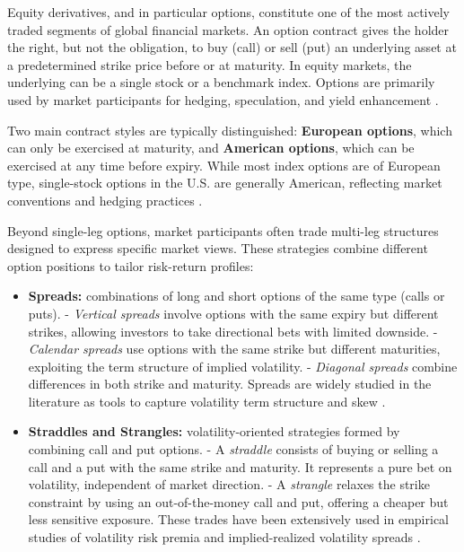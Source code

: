 \documentclass[12pt,a4paper]{report}
\begin{document}
Equity derivatives, and in particular options, constitute one of the most actively traded segments of global financial markets. An option contract gives the holder the right, but not the obligation, to buy (call) or sell (put) an underlying asset at a predetermined strike price before or at maturity. In equity markets, the underlying can be a single stock or a benchmark index. Options are primarily used by market participants for hedging, speculation, and yield enhancement \citep{hull2018options}.

Two main contract styles are typically distinguished: \textbf{European options}, which can only be exercised at maturity, and \textbf{American options}, which can be exercised at any time before expiry. While most index options are of European type, single-stock options in the U.S. are generally American, reflecting market conventions and hedging practices \citep{cboe2020guide}.

Beyond single-leg options, market participants often trade multi-leg structures designed to express specific market views. These strategies combine different option positions to tailor risk-return profiles:

\begin{itemize}
    \item \textbf{Spreads:} combinations of long and short options of the same type (calls or puts).  
    - \emph{Vertical spreads} involve options with the same expiry but different strikes, allowing investors to take directional bets with limited downside.  
    - \emph{Calendar spreads} use options with the same strike but different maturities, exploiting the term structure of implied volatility.  
    - \emph{Diagonal spreads} combine differences in both strike and maturity.  
    Spreads are widely studied in the literature as tools to capture volatility term structure and skew \citep{stoll1969price, chance1996analysis}.  

    \item \textbf{Straddles and Strangles:} volatility-oriented strategies formed by combining call and put options.  
    - A \emph{straddle} consists of buying or selling a call and a put with the same strike and maturity. It represents a pure bet on volatility, independent of market direction.  
    - A \emph{strangle} relaxes the strike constraint by using an out-of-the-money call and put, offering a cheaper but less sensitive exposure.  
    These trades have been extensively used in empirical studies of volatility risk premia and implied-realized volatility spreads \citep{carr2001empirical, bollerslev2009volatility}.  
\end{itemize}
\end{document}
